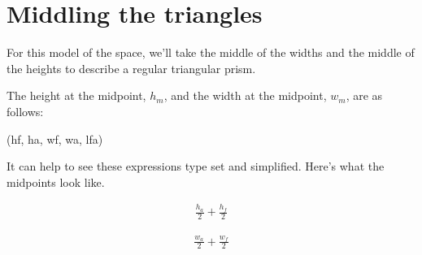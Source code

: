 \documentclass[letterpaper,10pt,english]{sphinxmanual}
\begin{document}
\section{Middling the triangles}
\label{\detokenize{prism:middling-the-triangles}}
\sphinxAtStartPar
For this model of the space, we’ll take the middle of the widths and the middle of the heights to describe a regular triangular prism.

\sphinxAtStartPar
The height at the  midpoint, \(h_m\), and the width at the midpoint, \(w_m\), are as follows:

\begin{sphinxVerbatim}[commandchars=\\\{\}]
\end{sphinxVerbatim}

\begin{sphinxVerbatim}[commandchars=\\\{\}]
(h\PYGZus{}f, h\PYGZus{}a, w\PYGZus{}f, w\PYGZus{}a, l\PYGZus{}fa)
\end{sphinxVerbatim}

\begin{sphinxVerbatim}[commandchars=\\\{\}]
     
     
\end{sphinxVerbatim}

\sphinxAtStartPar
It can help to see these expressions type set and simplified. Here’s what the midpoints look like.

\begin{sphinxVerbatim}[commandchars=\\\{\}]
\end{sphinxVerbatim}
\begin{equation*}
\begin{split}\displaystyle \frac{h_{a}}{2} + \frac{h_{f}}{2}\end{split}
\end{equation*}
\begin{sphinxVerbatim}[commandchars=\\\{\}]
\end{sphinxVerbatim}
\begin{equation*}
\begin{split}\displaystyle \frac{w_{a}}{2} + \frac{w_{f}}{2}\end{split}
\end{equation*}
\end{document}
